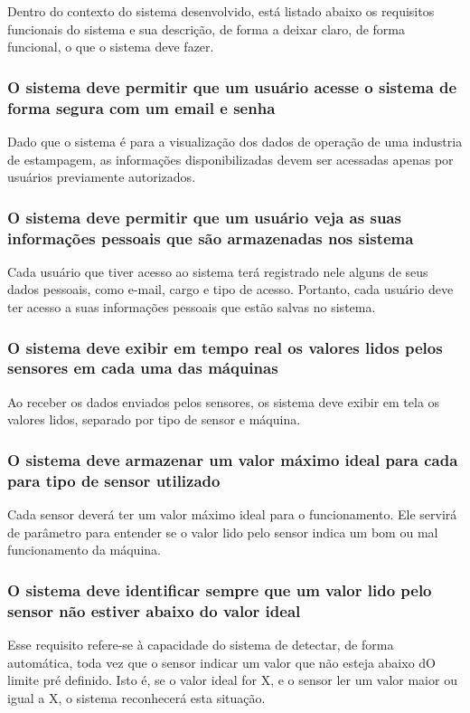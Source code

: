 Dentro do contexto do sistema desenvolvido, está listado abaixo os requisitos funcionais do sistema e sua descrição, de forma a deixar claro, de forma funcional, o que o sistema deve fazer.

\subsubsection{O sistema deve permitir que um usuário acesse o sistema de forma segura com um email e senha}
Dado que o sistema é para a visualização dos dados de operação de uma industria de estampagem, as informações disponibilizadas devem ser acessadas apenas por usuários previamente autorizados.

\subsubsection{O sistema deve permitir que um usuário veja as suas informações pessoais que são armazenadas nos sistema}
Cada usuário que tiver acesso ao sistema terá registrado nele alguns de seus dados pessoais, como e-mail, cargo e tipo de acesso. Portanto, cada usuário deve ter acesso a suas informações pessoais que estão salvas no sistema.

\subsubsection{O sistema deve exibir em tempo real os valores lidos pelos sensores em cada uma das máquinas}
Ao receber os dados enviados pelos sensores, os sistema deve exibir em tela os valores lidos, separado por tipo de sensor e máquina. 

\subsubsection{O sistema deve armazenar um valor máximo ideal para cada para tipo de sensor utilizado}
Cada sensor deverá ter um valor máximo ideal para o funcionamento. Ele servirá de parâmetro para entender se o valor lido pelo sensor indica um bom ou mal funcionamento da máquina.

\subsubsection{O sistema deve identificar sempre que um valor lido pelo sensor não estiver abaixo do valor ideal}
Esse requisito refere-se à capacidade do sistema de detectar, de forma automática, toda vez que o sensor indicar um valor que não esteja abaixo dO limite pré definido. Isto é, se o valor ideal for X, e o sensor ler um valor maior ou igual a X, o sistema reconhecerá esta situação.

